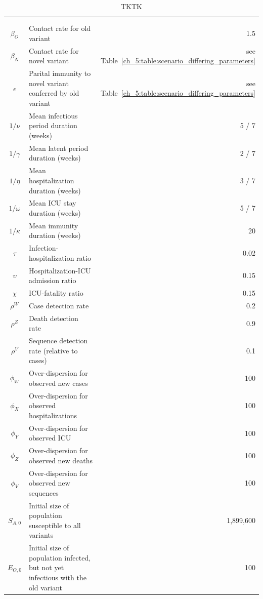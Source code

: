\begin{xltabular}{\columnwidth}{c>{\RaggedRight}Xr}
\label{ch_5:tbl:simulation_parameters_and_interpretations}\\
\caption{TKTK}\\[\belowcaptionskip]
 &  &  \\ \hline
\( \beta_{O} \)  & Contact rate for old variant & 1.5 \\
\( \beta_{N} \)  & Contact rate for novel variant &  see Table~\ref{ch_5:table:scenario_differing_parameters} \\
\( \epsilon \) & Parital immunity to novel variant conferred by old variant & see Table~\ref{ch_5:table:scenario_differing_parameters} \\
\( 1 / \nu \) & Mean infectious period duration (weeks) & 5 / 7 \\
\( 1 / \gamma \) & Mean latent period duration (weeks) & 2 / 7 \\
\( 1 / \eta \) & Mean hospitalization duration (weeks) & 3 / 7 \\
\( 1 / \omega \) & Mean ICU stay duration (weeks) & 5 / 7 \\
\( 1 / \kappa \) & Mean immunity duration (weeks) & 20 \\
\( \tau \) & Infection-hospitalization ratio & 0.02 \\
\( \upsilon \) & Hospitalization-ICU admission ratio & 0.15 \\
\( \chi \) & ICU-fatality ratio & 0.15 \\
\( \rho^W \) & Case detection rate & 0.2 \\
\( \rho^Z \) & Death detection rate & 0.9 \\
\( \rho^V \) & Sequence detection rate (relative to cases) & 0.1 \\
\( \phi_W \) & Over-dispersion for observed new cases & 100 \\
\( \phi_X \) & Over-dispersion for observed hospitalizations & 100 \\
\( \phi_Y \) & Over-dispersion for observed ICU & 100 \\
\( \phi_Z \) & Over-dispersion for observed new deaths & 100 \\
\( \phi_V \) & Over-dispersion for observed new sequences & 100 \\
\( S_{A,0} \) & Initial size of population susceptible to all variants & 1,899,600 \\
\( E_{O,0} \) & Initial size of population infected, but not yet infectious with the old variant & 100 \\

\end{xltabular}
